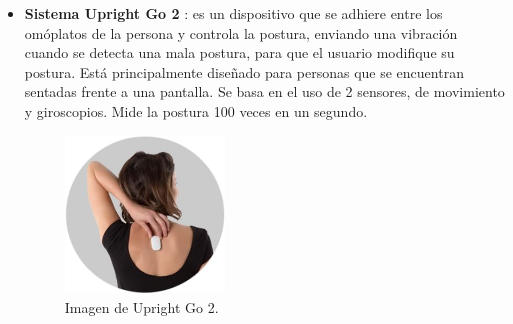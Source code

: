 \begin{itemize}
    \item \textbf{Sistema Upright Go 2} \cite{UprightGo1, UprightGo2,UprightGo3,UprightGo4,UprightGo5,UprightGo6}: es un dispositivo que se adhiere entre los omóplatos de la persona y controla la postura, enviando una vibración cuando se detecta una mala postura, para que el usuario modifique su postura. Está principalmente diseñado para personas que se encuentran sentadas frente a una pantalla. Se basa en el uso de 2 sensores, de movimiento y giroscopios. Mide la postura 100 veces en un segundo. 

    \clearpage
\begin{figure}[h!]
    \centering
    \includegraphics[width=0.4\textwidth]{img/imgUprigh2.jpg}
    \caption{Imagen de Upright Go 2.\cite{UprightGo2}}
    \label{fig:imgUpright2} 
\end{figure}
    

\end{itemize}
